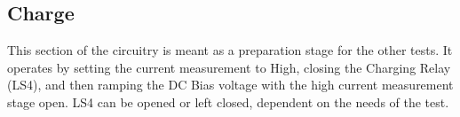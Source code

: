 \subsection{Charge}

This section of the circuitry is meant as a preparation stage for the other tests. 
It operates by setting the current measurement to High, closing the Charging Relay (LS4), and then ramping the DC Bias voltage with the high current measurement stage open. LS4 can be opened or left closed, dependent on the needs of the test.

